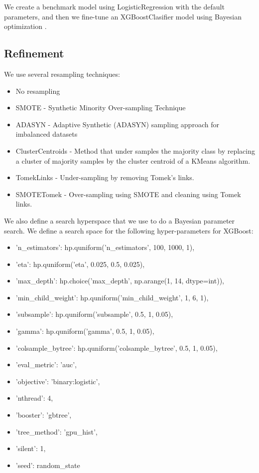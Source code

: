 We create a benchmark model using LogisticRegression with the default parameters, and then we fine-tune an XGBoostClasifier model using Bayesian optimization \cite{willkoehrsen2018}.

\subsection{Refinement}

We use several resampling techniques:
\begin{itemize}
    \item No resampling
    \item SMOTE -  Synthetic Minority Over-sampling Technique
    \item ADASYN - Adaptive Synthetic (ADASYN) sampling approach for imbalanced datasets
    \item ClusterCentroids - Method that under samples the majority class by replacing a cluster of majority samples by the cluster centroid of a KMeans algorithm. 
    \item TomekLinks -  Under-sampling by removing Tomek's links.
    \item SMOTETomek - Over-sampling using SMOTE and cleaning using Tomek links.
\end{itemize}

We also define a search hyperspace that we use to do a Bayesian parameter search. We define a search space for the following hyper-parameters for XGBoost:

\begin{itemize}
    \item 'n\_estimators': hp.quniform('n\_estimators', 100, 1000, 1),
    \item 'eta': hp.quniform('eta', 0.025, 0.5, 0.025),
    \item 'max\_depth':  hp.choice('max\_depth', np.arange(1, 14, dtype=int)),
    \item 'min\_child\_weight': hp.quniform('min\_child\_weight', 1, 6, 1),
    \item 'subsample': hp.quniform('subsample', 0.5, 1, 0.05),
    \item 'gamma': hp.quniform('gamma', 0.5, 1, 0.05),
    \item 'colsample\_bytree': hp.quniform('colsample\_bytree', 0.5, 1, 0.05),
    \item 'eval\_metric': 'auc',
    \item 'objective': 'binary:logistic',
    \item 'nthread': 4,
    \item 'booster': 'gbtree',
    \item 'tree\_method': 'gpu\_hist',
    \item 'silent': 1,
    \item 'seed': random\_state 
\end{itemize}